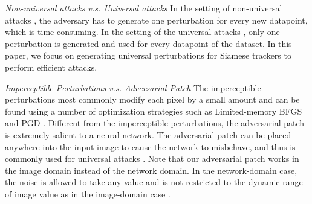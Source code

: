 \documentclass[journal]{IEEEtran}
\begin{document}
\textit{Non-universal attacks v.s. Universal attacks} In the setting of non-universal attacks \cite{dai2018adversarial,li2018second,lin2017tactics}, the adversary has to generate one perturbation for every new datapoint, which is time consuming. In the setting of the universal attacks \cite{khrulkov2018art,mopuri2018nag,zhang2020understanding,mopuri2018generalizable,chen2018shapeshifter}, only one perturbation is generated and used for every datapoint of the dataset. In this paper, we focus on generating universal perturbations for Siamese trackers to perform efficient attacks.

\textit{Imperceptible Perturbations v.s. Adversarial Patch} The imperceptible perturbations most commonly modify each pixel by a small amount and can be found using a number of optimization strategies such as Limited-memory BFGS \cite{intriguing} and PGD \cite{PGD}.
Different from the imperceptible perturbations, the adversarial patch is extremely salient to a neural network. The adversarial patch can be placed anywhere into the input image to cause the network to misbehave, and thus is commonly used for universal attacks \cite{patch}.
Note that our adversarial patch works in the image domain instead of the network domain. In the network-domain case, the noise is allowed to take any value and is not restricted to the dynamic range of image value as in the image-domain case \cite{karmon2018lavan}.
\end{document}
